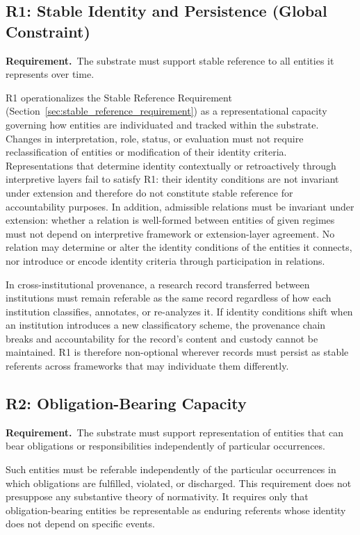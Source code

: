 \subsection{R1: Stable Identity and Persistence (Global Constraint)}

\textbf{Requirement.}~The substrate must support stable reference to all entities
it represents over time.

R1 operationalizes the Stable Reference Requirement (Section~\ref{sec:stable_reference_requirement})
as a representational capacity governing how entities are individuated and tracked
within the substrate.
Changes in interpretation, role, status, or evaluation must not require
reclassification of entities or modification of their identity criteria.
Representations that determine identity contextually or retroactively
through interpretive layers fail to satisfy R1:
their identity conditions are not invariant under extension and
therefore do not constitute stable reference for accountability purposes.
In addition, admissible relations must be invariant under extension:
whether a relation is well-formed between entities of given regimes
must not depend on interpretive framework or extension-layer agreement.
No relation may determine or alter the identity conditions
of the entities it connects, nor introduce or encode identity criteria
through participation in relations.

In cross-institutional provenance, a research record transferred between
institutions must remain referable as the same record regardless of how
each institution classifies, annotates, or re-analyzes it.
If identity conditions shift when an institution introduces a new
classificatory scheme, the provenance chain breaks and accountability
for the record's content and custody cannot be maintained.
R1 is therefore non-optional wherever records must persist as stable
referents across frameworks that may individuate them differently.

\subsection{R2: Obligation-Bearing Capacity}

\textbf{Requirement.}~The substrate must support representation of entities that can bear
obligations or responsibilities independently of particular occurrences.

Such entities must be referable independently of the particular occurrences
in which obligations are fulfilled, violated, or discharged.
This requirement does not presuppose any substantive theory of normativity.
It requires only that obligation-bearing entities be representable as enduring
referents whose identity does not depend on specific events.

